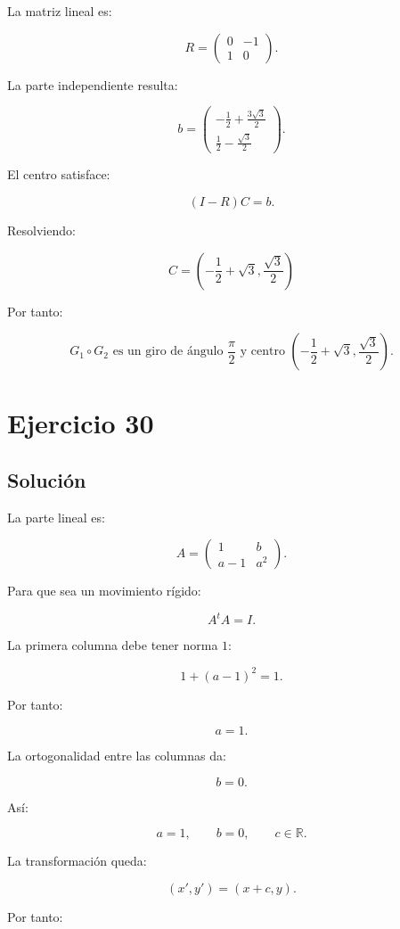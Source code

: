 \documentclass[11pt,a4paper]{article}
\newcommand{\R}{\mathbb{R}}
\begin{document}
La matriz lineal es:

\[
R=
\begin{pmatrix}
0&-1\\
1&0
\end{pmatrix}.
\]

La parte independiente resulta:

\[
b=
\begin{pmatrix}
-\frac12+\frac{3\sqrt3}{2}\\[1mm]
\frac12-\frac{\sqrt3}{2}
\end{pmatrix}.
\]

El centro satisface:

\[
(I-R)C=b.
\]

Resolviendo:

\[
\boxed{
C=
\left(
-\frac12+\sqrt3,
\frac{\sqrt3}{2}
\right)
}
\]

Por tanto:

\[
\boxed{
G_1\circ G_2
\text{ es un giro de ángulo }
\frac{\pi}{2}
\text{ y centro }
\left(
-\frac12+\sqrt3,
\frac{\sqrt3}{2}
\right).
}
\]

\section{Ejercicio 30}
\subsection{Solución}

La parte lineal es:

\[
A=
\begin{pmatrix}
1&b\\
a-1&a^2
\end{pmatrix}.
\]

Para que sea un movimiento rígido:

\[
A^tA=I.
\]

La primera columna debe tener norma \(1\):

\[
1+(a-1)^2=1.
\]

Por tanto:

\[
a=1.
\]

La ortogonalidad entre las columnas da:

\[
b=0.
\]

Así:

\[
\boxed{
a=1,
\qquad
b=0,
\qquad
c\in\R.
}
\]

La transformación queda:

\[
(x',y')=(x+c,y).
\]

Por tanto:
\end{document}
